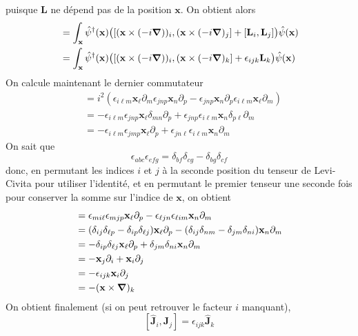 \documentclass{article}
\numberwithin{equation}{section}
\theoremstyle{solution}
\begin{document}
puisque $\mathbf{L}$ ne dépend pas de la position $\mathbf{x}$. 
On obtient alors
\begin{align*}
        [\hat{\mathbf{J}}_{i}, \hat{\mathbf{J}}_j] 
        &= 
        \int_{\mathbf{x}} \hat{\psi}^{\dagger}(\mathbf{x})\big([(\mathbf{x} \times (-i \grad))_{i},(\mathbf{x} \times (-i \grad)_{j}] + [\mathbf{L}_{i}, \mathbf{L}_j]\big)\hat{\psi}(\mathbf{x}) \\ 
        &= 
        \int_{\mathbf{x}} \hat{\psi}^{\dagger}(\mathbf{x})\big([(\mathbf{x} \times (-i \grad))_{i},(\mathbf{x} \times (-i \grad)_{k}] + \epsilon_{ijk} \mathbf{L}_{k}\big)\hat{\psi}(\mathbf{x})
\end{align*}
On calcule maintenant le dernier commutateur
\begin{align*}
        [(\mathbf{x} \times (-i \grad))_{i},(\mathbf{x} \times (-i \grad))_{k}] 
        &=  i^2( \epsilon_{i \ell m}\mathbf{x}_{\ell} \partial_{m} \epsilon_{jnp}\mathbf{x}_n \partial_{p} - \epsilon_{jnp} \mathbf{x}_{n}\partial_{p} \epsilon_{i\ell m} \mathbf{x}_{\ell} \partial_{m}) \\
        &=  - \epsilon_{i \ell m}\epsilon_{jnp}\mathbf{x}_{\ell} \delta_{mn} \partial_{p} + \epsilon_{jnp}\epsilon_{i\ell m} \mathbf{x}_{n} \delta_{p \ell} \partial_{m} \\
        &=   - \epsilon_{i \ell m}\epsilon_{jmp}\mathbf{x}_{\ell} \partial_{p} + \epsilon_{jn\ell}\epsilon_{i\ell m} \mathbf{x}_{n} \partial_{m} 
\end{align*}
On sait que
\begin{equation}
        \epsilon_{abc}\epsilon_{efg} = \delta_{bf}\delta_{cg} - \delta_{bg}\delta_{cf}
\end{equation} 
donc, en permutant les indices $i$ et $j$ à la seconde position du tenseur de Levi-Civita pour utiliser l'identité, et 
en permutant le premier tenseur une seconde fois pour conserver la somme sur l'indice de $\mathbf{x}$, on obtient
\begin{align*}
        [(\mathbf{x} \times (-i \grad))_{i},(\mathbf{x} \times (-i \grad))_{k}] 
        &=  \epsilon_{m i \ell}\epsilon_{m j p}\mathbf{x}_{\ell} \partial_{p} - \epsilon_{\ell j n}\epsilon_{\ell im} \mathbf{x}_{n} \partial_{m}  \\
        &=  (\delta_{i j} \delta_{\ell p} - \delta_{i p} \delta_{\ell j})\mathbf{x}_{\ell} \partial_{p} - (\delta_{ij} \delta_{nm} - \delta_{jm}\delta_{n i})\mathbf{x}_{n} \partial_{m}  \\
        &=   -\delta_{i p} \delta_{\ell j}\mathbf{x}_{\ell} \partial_{p} + \delta_{jm}\delta_{n i}\mathbf{x}_{n} \partial_{m}  \\
        &=   -\mathbf{x}_{j} \partial_{i} + \mathbf{x}_{i} \partial_{j}  \\
        &= -\epsilon_{ijk}\mathbf{x}_i\partial_{j} \\
        &= -(\mathbf{x} \times \grad)_{k}
\end{align*}
On obtient finalement (si on peut retrouver le facteur $i$ manquant),
\begin{equation}
        \boxed{[\hat{\mathbf{J}}_{i}, \hat{\mathbf{J}}_{j}] = \epsilon_{ijk}\hat{\mathbf{J}}_{k}}
\end{equation} 
\end{document}
